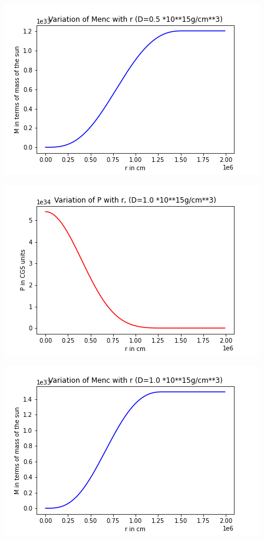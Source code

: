 \documentclass{article}
\begin{document}
\begin{center}
\begin{multicols}{2}
\begin{center}
        \end{center}
\columnbreak
	\begin{center}
       \includegraphics[scale=0.4]{Images/Mr_pb2_1}
       \end{center}
\end{multicols}
\begin{multicols}{2}
	\begin{center}
        \includegraphics[scale=0.37]{Images/Pr_pb2_2}
        \end{center}
\columnbreak
	\begin{center}
       \includegraphics[scale=0.37]{Images/Mr_pb2_2}

\end{center}
\end{multicols}
\end{center}
\end{document}

